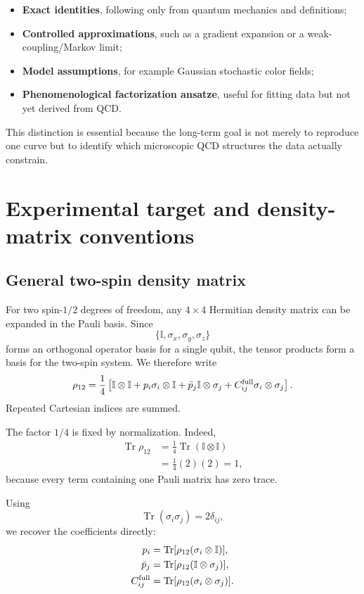 \documentclass[11pt]{article}
\newcommand{\Id}{\mathbb I}
\newcommand{\Trc}{\operatorname{Tr}}
\begin{document}
\begin{itemize}[leftmargin=1.5em]
\item \textbf{Exact identities}, following only from quantum mechanics and definitions;
\item \textbf{Controlled approximations}, such as a gradient expansion or a weak-coupling/Markov limit;
\item \textbf{Model assumptions}, for example Gaussian stochastic color fields;
\item \textbf{Phenomenological factorization ansatze}, useful for fitting data but not yet derived from QCD.
\end{itemize}

This distinction is essential because the long-term goal is not merely to reproduce one curve but to identify which microscopic QCD structures the data actually constrain.

\section{Experimental target and density-matrix conventions}

\subsection{General two-spin density matrix}

For two spin-$1/2$ degrees of freedom, any $4\times4$ Hermitian density matrix can be expanded in the Pauli basis. Since
\begin{equation}
\{\Id,\sigma_x,\sigma_y,\sigma_z\}
\end{equation}
forms an orthogonal operator basis for a single qubit, the tensor products form a basis for the two-spin system. We therefore write
\begin{equation}
\rho_{12}
=
\frac14\left[
\Id\otimes\Id
+p_i\sigma_i\otimes\Id
+\bar p_j\Id\otimes\sigma_j
+C^{\rm full}_{ij}\sigma_i\otimes\sigma_j
\right].
\label{eq:rho_general}
\end{equation}
Repeated Cartesian indices are summed.

The factor $1/4$ is fixed by normalization. Indeed,
\begin{align}
\Trc\rho_{12}
&=\frac14\Trc(\Id\otimes\Id)\\
&=\frac14(2)(2)=1,
\end{align}
because every term containing one Pauli matrix has zero trace.

Using
\begin{equation}
\Trc(\sigma_i\sigma_j)=2\delta_{ij},
\end{equation}
we recover the coefficients directly:
\begin{align}
p_i&=\Trc[\rho_{12}(\sigma_i\otimes\Id)],\\
\bar p_j&=\Trc[\rho_{12}(\Id\otimes\sigma_j)],\\
C^{\rm full}_{ij}&=\Trc[\rho_{12}(\sigma_i\otimes\sigma_j)].
\end{align}
\end{document}
